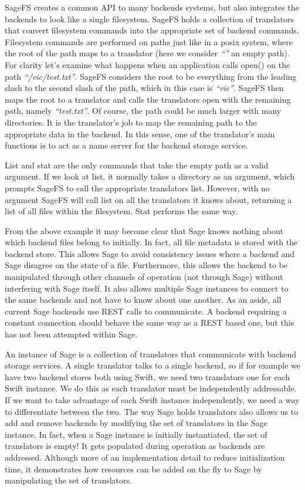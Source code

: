 SageFS creates a common API to many backends systems, but also integrates the backends to look like a single filesystem. SageFS holds a collection of translators that convert filesystem commands into the appropriate set of backend commands. Filesystem commands are performed on paths just like in a posix system, where the root of the path maps to a translator (here we consider \textit{``''} an empty path). For clarity let's examine what happens when an application calls open() on the path \textit{``/vic/test.txt''}. SageFS considers the root to be everything from the leading slash to the second slash of the path, which in this case is \textit{``vic''}. SageFS then maps the root to a translator and calls the translators open with the remaining path, namely \textit{``test.txt''}. Of course, the path could be much larger with many directories. It is the translator's job to map the remaining path to the appropriate data in the backend. In this sense, one of the translator's main functions is to act as a name server for the backend storage service.

List and stat are the only commands that take the empty path as a valid argument. If we look at list, it normally takes a directory as an argument, which prompts SageFS to call the appropriate translators list. However, with no argument SageFS will call list on all the translators it knows about, returning a list of all files within the filesystem. Stat performs the same way.

From the above example it may become clear that Sage knows nothing about which backend files belong to initially. In fact, all file metadata is stored with the backend store. This allows Sage to avoid consistency issues where a backend and Sage disagree on the state of a file. Furthermore, this allows the backend to be manipulated through other channels of operation (not through Sage) without interfering with Sage itself. It also allows multiple Sage instances to connect to the same backends and not have to know about one another. As an aside, all current Sage backends use REST calls to communicate. A backend requiring a constant connection should behave the same way as a REST based one, but this has not been attempted within Sage.

An instance of Sage is a collection of translators that communicate with backend storage services. A single translator talks to a single backend, so if for example we have two backend stores both using Swift, we need two translators one for each Swift instance. We do this as each translator must be independently addressable. If we want to take advantage of each Swift instance independently, we need a way to differentiate between the two. The way Sage holds translators also allows us to add and remove backends by modifying the set of translators in the Sage instance. In fact, when a Sage instance is initially instantiated, the set of translators is empty! It gets populated during operation as backends are addressed. Although more of an implementation detail to reduce initialization time, it demonstrates how resources can be added on the fly to Sage by manipulating the set of translators.

